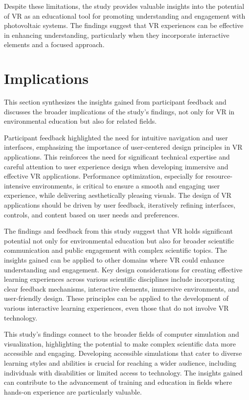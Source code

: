 \documentclass[draft, final]{vutinfth} %
\begin{document}
Despite these limitations, the study provides valuable insights into the potential of VR as an educational tool for promoting understanding and engagement with photovoltaic systems. The findings suggest that VR experiences can be effective in enhancing understanding, particularly when they incorporate interactive elements and a focused approach.

\section{Implications}

This section synthesizes the insights gained from participant feedback and discusses the broader implications of the study's findings, not only for VR in environmental education but also for related fields.

Participant feedback highlighted the need for intuitive navigation and user interfaces, emphasizing the importance of user-centered design principles in VR applications. This reinforces the need for significant technical expertise and careful attention to user experience design when developing immersive and effective VR applications. Performance optimization, especially for resource-intensive environments, is critical to ensure a smooth and engaging user experience, while delivering aesthetically pleasing visuals. The design of VR applications should be driven by user feedback, iteratively refining interfaces, controls, and content based on user needs and preferences.

The findings and feedback from this study suggest that VR holds significant potential not only for environmental education but also for broader scientific communication and public engagement with complex scientific topics. The insights gained can be applied to other domains where VR could enhance understanding and engagement. Key design considerations for creating effective learning experiences across various scientific disciplines include incorporating clear feedback mechanisms, interactive elements, immersive environments, and user-friendly design. These principles can be applied to the development of various interactive learning experiences, even those that do not involve VR technology.

This study's findings connect to the broader fields of computer simulation and visualization, highlighting the potential to make complex scientific data more accessible and engaging. Developing accessible simulations that cater to diverse learning styles and abilities is crucial for reaching a wider audience, including individuals with disabilities or limited access to technology. The insights gained can contribute to the advancement of training and education in fields where hands-on experience are particularly valuable.
\end{document}
